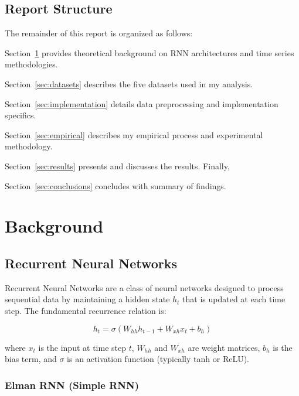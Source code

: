 \documentclass[conference]{IEEEtran}
\begin{document}
\subsection{Report Structure}

The remainder of this report is organized as follows:

Section~\ref{sec:background} provides theoretical background on RNN
architectures and time series methodologies.

Section~\ref{sec:datasets} describes the five datasets used in my 
analysis.

Section~\ref{sec:implementation} details data preprocessing and
implementation specifics.

Section~\ref{sec:empirical} describes my empirical process and
experimental methodology.

Section~\ref{sec:results} presents and discusses the results. Finally,

Section~\ref{sec:conclusions} concludes with summary of findings.


\section{Background}
\label{sec:background}

\subsection{Recurrent Neural Networks}

Recurrent Neural Networks are a class of neural networks designed to
process sequential data by maintaining a hidden state $h_t$ that is
updated at each time step. The fundamental recurrence relation is:

\begin{equation}
h_t = \sigma(W_{hh}h_{t-1} + W_{xh}x_t + b_h)
\end{equation}

where $x_t$ is the input at time step $t$, $W_{hh}$ and $W_{xh}$ are
weight matrices, $b_h$ is the bias term, and $\sigma$ is an
activation function (typically tanh or ReLU).

\subsubsection{Elman RNN (Simple RNN)}
\end{document}
